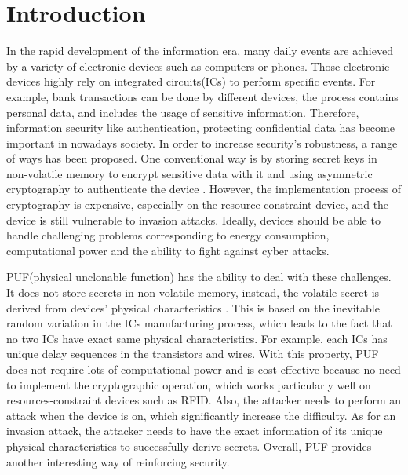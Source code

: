 \chapter{Introduction}
In the rapid development of the information era, many daily events are achieved by a variety of electronic devices such as computers or phones.
Those electronic devices highly rely on integrated circuits(ICs) to perform specific events. For example, bank transactions can be done by different devices,
the process contains personal data, and includes the usage of sensitive information. Therefore, information security like authentication, protecting confidential data
has become important in nowadays society. In order to increase security's robustness, a range of ways has been proposed. One conventional way is by storing secret keys in non-volatile memory to encrypt sensitive data with it
and using asymmetric cryptography to authenticate the device \cite{Reference3}. However, the implementation process of cryptography is expensive, especially on the resource-constraint device, and the device is still vulnerable to invasion attacks. Ideally, devices should be able to handle challenging problems corresponding to energy consumption, 
computational power and the ability to fight against cyber attacks. \par

PUF(physical unclonable function) has the ability to deal with these challenges. It does not store secrets in non-volatile memory, instead, the volatile secret is derived from devices' physical characteristics \cite{Reference3}.
This is based on the inevitable random variation in the ICs manufacturing process, which leads to the fact that no two ICs have exact same physical characteristics. For example, each ICs has unique delay sequences in the transistors and wires.
With this property, PUF does not require lots of computational power and is cost-effective because no need to implement the cryptographic operation, which works particularly well on
resources-constraint devices such as RFID. Also, the attacker needs to perform an attack when the device is on, which significantly increase the difficulty. As for an invasion attack, 
the attacker needs to have the exact information of its unique physical characteristics to successfully derive secrets. Overall, PUF provides another interesting way of reinforcing security.

